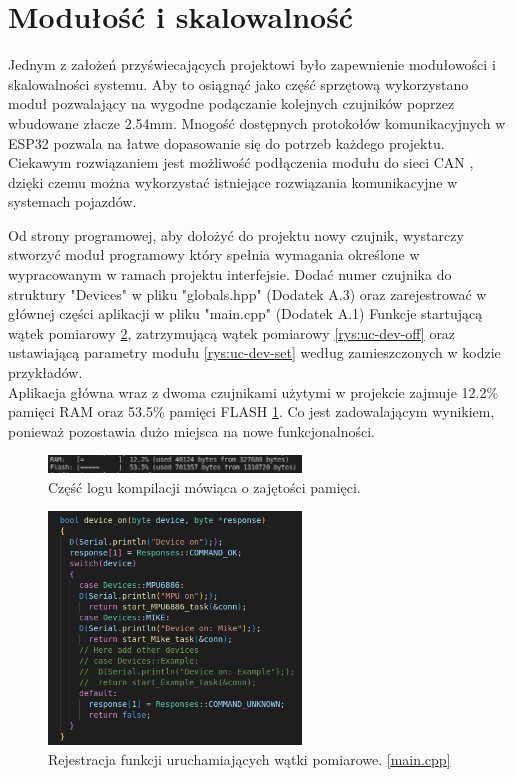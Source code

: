 \documentclass[12pt,oneside,a4paper]{book}
\theoremstyle{break}
\begin{document}
\section{Modułość i skalowalność}

Jednym z założeń przyświecających projektowi było zapewnienie modułowości i skalowalności systemu.
Aby to osiągnąć jako część sprzętową wykorzystano moduł pozwalający na wygodne podączanie kolejnych
czujników poprzez wbudowane złacze 2.54mm. Mnogość dostępnych protokołów komunikacyjnych w ESP32
pozwala na łatwe dopasowanie się do potrzeb każdego projektu. Ciekawym rozwiązaniem jest możliwość
podłączenia modułu do sieci CAN \cite{esp32-can}, dzięki czemu można wykorzystać istniejące rozwiązania komunikacyjne
w systemach pojazdów.
\par Od strony programowej, aby dołożyć do projektu nowy czujnik, wystarczy stworzyć moduł programowy
który spełnia wymagania określone w wypracowanym w ramach projektu interfejsie. Dodać numer czujnika do
struktury "Devices" w pliku "globals.hpp" (Dodatek A.3) oraz zarejestrować w głównej części aplikacji w pliku "main.cpp" (Dodatek A.1)
Funkcje startującą wątek pomiarowy \ref{rys:uc-dev-on}, zatrzymującą wątek pomiarowy \ref{rys:uc-dev-off}
oraz ustawiającą parametry modułu \ref{rys:uc-dev-set} według
zamieszczonych w kodzie przykładów.\\
Aplikacja główna wraz z dwoma czujnikami użytymi w projekcie zajmuje 12.2\% pamięci RAM oraz 53.5\% pamięci FLASH \ref{rys:uc-memory}. Co
jest zadowalającym wynikiem, ponieważ pozostawia dużo miejsca na nowe funkcjonalności.

\begin{figure}[H]
    \begin{center}
        \includegraphics[width=0.6\textwidth]{uc-memory}
        \caption{Część logu kompilacji mówiąca o zajętości pamięci.}
        \label{rys:uc-memory}
    \end{center}
\end{figure}

\begin{figure}[H]
    \begin{center}
        \includegraphics[width=0.6\textwidth]{uc-dev-on}
        \caption{Rejestracja funkcji uruchamiających wątki pomiarowe. \ref*{main.cpp}}
        \label{rys:uc-dev-on}
    \end{center}
\end{figure}
\end{document}
